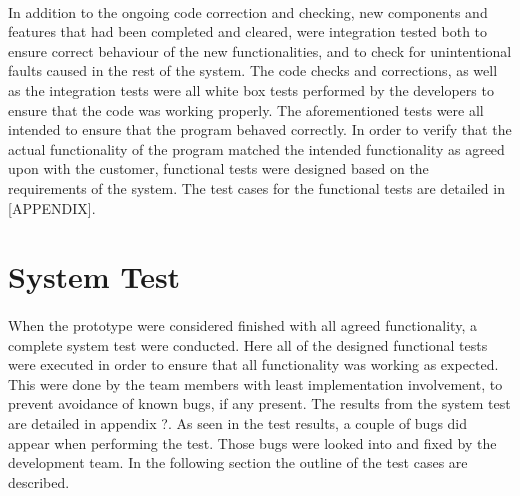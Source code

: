\paragraph{} In addition to the ongoing code correction and checking, new components and features that had been completed and cleared, were integration tested both to ensure correct behaviour of the new functionalities, and to check for unintentional faults caused in the rest of the system. The code checks and corrections, as well as the integration tests were all white box tests performed by the developers to ensure that the code was working properly. The aforementioned tests were all intended to ensure that the program behaved correctly. In order to verify that the actual functionality of the program matched the intended functionality as agreed upon with the customer, functional tests were designed based on the requirements of the system. The test cases for the functional tests are detailed in [APPENDIX]. 

\section{System Test}
\label{sec:TestingSystem}

\paragraph{} When the prototype were considered finished with all agreed functionality, a complete system test were conducted. Here all of the designed functional tests were executed  in order to ensure that all functionality was working as expected. This were done by the team members with least implementation involvement, to prevent avoidance of known bugs, if any present. The results from the system test are detailed in appendix ?. As seen in the test results, a couple of bugs did appear when performing the test. Those bugs were looked into and fixed by the development team. In the following section the outline of the test cases are described.

